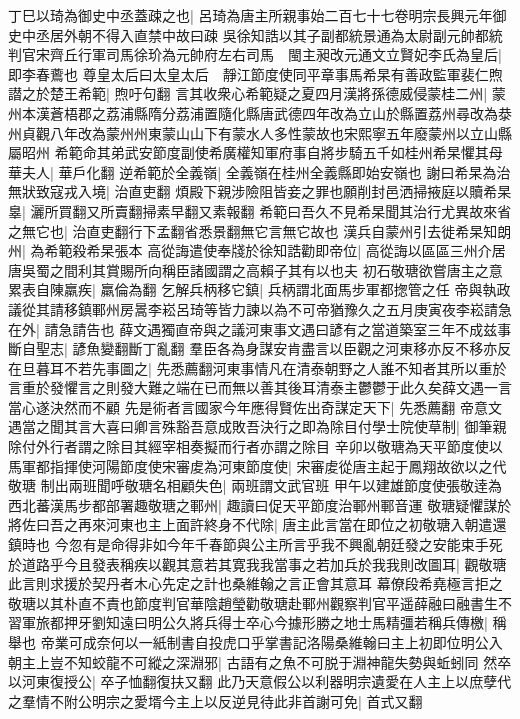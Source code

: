丁巳以琦為御史中丞蓋疎之也|{
	呂琦為唐主所親事始二百七十七卷明宗長興元年御史中丞居外朝不得入直禁中故曰疎}
吳徐知誥以其子副都統景通為太尉副元帥都統判官宋齊丘行軍司馬徐玠為元帥府左右司馬　閩主昶改元通文立賢妃李氏為皇后|{
	即李春鷰也}
尊皇太后曰太皇太后　靜江節度使同平章事馬希杲有善政監軍裴仁煦譛之於楚王希範|{
	煦吁句翻}
言其收衆心希範疑之夏四月漢將孫德威侵蒙桂二州|{
	蒙州本漢蒼梧郡之荔浦縣隋分荔浦置隨化縣唐武德四年改為立山於縣置荔州尋改為㳟州貞觀八年改為蒙州州東蒙山山下有蒙水人多性蒙故也宋熙寧五年廢蒙州以立山縣屬昭州}
希範命其弟武安節度副使希廣權知軍府事自將步騎五千如桂州希杲懼其母華夫人|{
	華戶化翻}
逆希範於全義嶺|{
	全義嶺在桂州全義縣即始安嶺也}
謝曰希杲為治無狀致寇戎入境|{
	治直吏翻}
煩殿下親涉險阻皆妾之罪也願削封邑洒掃掖庭以贖希杲辠|{
	灑所買翻又所賣翻掃素早翻又素報翻}
希範曰吾久不見希杲聞其治行尤異故來省之無它也|{
	治直吏翻行下孟翻省悉景翻無它言無它故也}
漢兵自蒙州引去徙希杲知朗州|{
	為希範殺希杲張本}
高從誨遣使奉牋於徐知誥勸即帝位|{
	高從誨以區區三州介居唐吳蜀之間利其賞賜所向稱臣諸國謂之高賴子其有以也夫}
初石敬瑭欲嘗唐主之意累表自陳羸疾|{
	羸倫為翻}
乞解兵柄移它鎮|{
	兵柄謂北面馬步軍都揔管之任}
帝與執政議從其請移鎮鄆州房暠李崧呂琦等皆力諫以為不可帝猶豫久之五月庚寅夜李崧請急在外|{
	請急請告也}
薛文遇獨直帝與之議河東事文遇曰諺有之當道築室三年不成兹事斷自聖志|{
	諺魚變翻斷丁亂翻}
羣臣各為身謀安肯盡言以臣觀之河東移亦反不移亦反在旦暮耳不若先事圖之|{
	先悉薦翻河東事情凡在清泰朝野之人誰不知者其所以重於言重於發懼言之則發大難之端在已而無以善其後耳清泰主鬱鬱于此久矣薛文遇一言當心遂決然而不顧}
先是術者言國家今年應得賢佐出奇謀定天下|{
	先悉薦翻}
帝意文遇當之聞其言大喜曰卿言殊豁吾意成敗吾決行之即為除目付學士院使草制|{
	御筆親除付外行者謂之除目其經宰相奏擬而行者亦謂之除目}
辛卯以敬瑭為天平節度使以馬軍都指揮使河陽節度使宋審䖍為河東節度使|{
	宋審䖍從唐主起于鳳翔故欲以之代敬瑭}
制出兩班聞呼敬瑭名相顧失色|{
	兩班謂文武官班}
甲午以建雄節度使張敬逹為西北蕃漢馬步都部署趣敬瑭之鄆州|{
	趣讀曰促天平節度治鄆州鄆音運}
敬瑭疑懼謀於將佐曰吾之再來河東也主上面許終身不代除|{
	唐主此言當在即位之初敬瑭入朝遣還鎮時也}
今忽有是命得非如今年千春節與公主所言乎我不興亂朝廷發之安能束手死於道路乎今且發表稱疾以觀其意若其寛我我當事之若加兵於我我則改圖耳|{
	觀敬瑭此言則求援於契丹者木心先定之計也桑維翰之言正會其意耳}
幕僚段希堯極言拒之敬瑭以其朴直不責也節度判官華陰趙瑩勸敬瑭赴鄆州觀察判官平遥薛融曰融書生不習軍旅都押牙劉知遠曰明公久將兵得士卒心今據形勝之地士馬精彊若稱兵傳檄|{
	稱舉也}
帝業可成奈何以一紙制書自投虎口乎掌書記洛陽桑維翰曰主上初即位明公入朝主上豈不知蛟龍不可縱之深淵邪|{
	古語有之魚不可脱于淵神龍失勢與蚯蚓同}
然卒以河東復授公|{
	卒子恤翻復扶又翻}
此乃天意假公以利器明宗遺愛在人主上以庶孽代之羣情不附公明宗之愛壻今主上以反逆見待此非首謝可免|{
	首式又翻}
